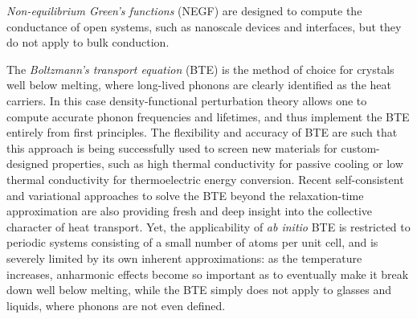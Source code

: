 \emph{Non-equilibrium Green's functions} (NEGF) \cite{Wang2008} are designed to compute the conductance of open systems, such as nanoscale devices and interfaces, but they do not apply to bulk conduction. 

The \emph{Boltzmann's transport equation} (BTE) \cite{Peierls1929,Zhou2016} is the method of choice for crystals well below melting, where long-lived phonons are clearly identified as the heat carriers. In this case density-functional perturbation theory \cite{Baroni1987a,Gonze1989,Baroni2001} allows one to compute accurate phonon frequencies \cite{Giannozzi1991} and lifetimes, \cite{Debernardi1995,Paulatto2013} and thus implement the BTE entirely from first principles. \cite{Broido:2007iu} 
The flexibility and accuracy of \abinitio BTE are such that this approach is being successfully used to screen new materials for custom-designed properties, such as high thermal conductivity for passive cooling \cite{Lindsay:2013fw,Lindsay:2013db} or low thermal conductivity for thermoelectric energy conversion. \cite{PhysRevX.4.011019,Schwingen2014} 
Recent self-consistent and variational approaches to solve the BTE beyond the relaxation-time approximation \cite{Fugallo2013} are also providing fresh and deep insight into the collective character of heat transport.\cite{Fugallo2013,Lee:2015ex,Cepellotti2015,Cepellotti:2016bk} 
Yet, the applicability of \emph{ab initio} BTE is restricted to periodic systems consisting of a small number of atoms per unit cell, and is severely limited by its own inherent approximations: as the temperature increases, anharmonic effects become so important as to eventually make it break down well below melting, \cite{Turney:2009bb} while the BTE simply does not apply to glasses and liquids, where phonons are not even defined. \cite{Allen1989} 

